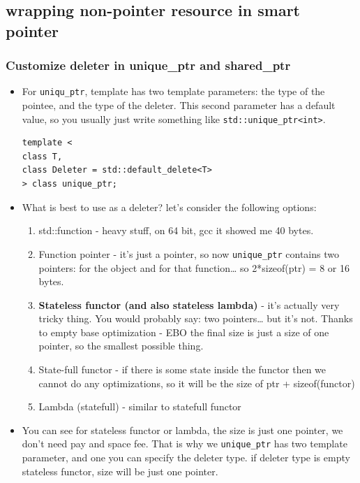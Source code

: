 \documentclass[a4paper,11pt,twoside]{book}
\begin{document}
\subsection{wrapping non-pointer resource in smart pointer}

\subsubsection{Customize deleter in unique\_ptr and shared\_ptr}

\begin{itemize}
	\item For \texttt{uniqu\_ptr}, template has two template parameters: the type of the pointee, and the type of the deleter. This second parameter has a default value, so you usually just write something like \texttt{std::unique\_ptr<int>}.
\begin{lstlisting}
template <
class T,
class Deleter = std::default_delete<T>
> class unique_ptr;
	\end{lstlisting}

	\item What is best to use as a deleter? let's consider the following options:
	\begin{enumerate}
		\item std::function - heavy stuff, on 64 bit, gcc it showed me 40 bytes.
		
		\item Function pointer - it’s just a pointer, so now \texttt{unique\_ptr} contains two pointers: for the object and for that function… so 2*sizeof(ptr) = 8 or 16 bytes.
		
		\item \textbf{Stateless functor (and also stateless lambda)} - it’s actually very tricky thing. You would probably say: two pointers… but it’s not. Thanks to empty base optimization - EBO the final size is just a size of one pointer, so the smallest possible thing.
		
		\item State-full functor - if there is some state inside the functor then we cannot do any optimizations, so it will be the size of ptr + sizeof(functor)
		
		\item Lambda (statefull) - similar to statefull functor
	\end{enumerate}

	\item You can see for stateless functor or lambda, the size is just one pointer, we don't need pay and space fee. That is why we \texttt{unique\_ptr} has two template parameter, and one you can specify the deleter type. if deleter type is empty stateless functor, size will be just one pointer. 
	

\end{itemize}
\end{document}
